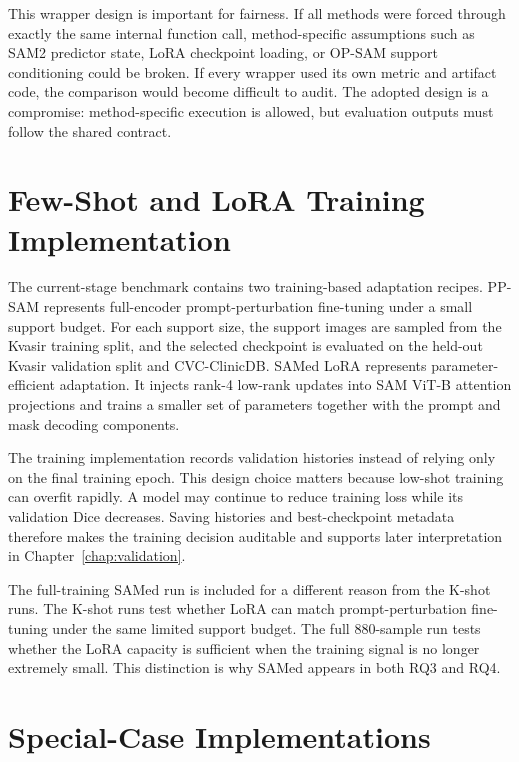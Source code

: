 This wrapper design is important for fairness. If all methods were forced through exactly the same internal function call, method-specific assumptions such as SAM2 predictor state, LoRA checkpoint loading, or OP-SAM support conditioning could be broken. If every wrapper used its own metric and artifact code, the comparison would become difficult to audit. The adopted design is a compromise: method-specific execution is allowed, but evaluation outputs must follow the shared contract.

\section{Few-Shot and LoRA Training Implementation}
\label{sec:training-implementation}

The current-stage benchmark contains two training-based adaptation recipes. PP-SAM represents full-encoder prompt-perturbation fine-tuning under a small support budget. For each support size, the support images are sampled from the Kvasir training split, and the selected checkpoint is evaluated on the held-out Kvasir validation split and CVC-ClinicDB. SAMed LoRA represents parameter-efficient adaptation. It injects rank-4 low-rank updates into SAM ViT-B attention projections and trains a smaller set of parameters together with the prompt and mask decoding components.

The training implementation records validation histories instead of relying only on the final training epoch. This design choice matters because low-shot training can overfit rapidly. A model may continue to reduce training loss while its validation Dice decreases. Saving histories and best-checkpoint metadata therefore makes the training decision auditable and supports later interpretation in Chapter~\ref{chap:validation}.

The full-training SAMed run is included for a different reason from the K-shot runs. The K-shot runs test whether LoRA can match prompt-perturbation fine-tuning under the same limited support budget. The full 880-sample run tests whether the LoRA capacity is sufficient when the training signal is no longer extremely small. This distinction is why SAMed appears in both RQ3 and RQ4.

\section{Special-Case Implementations}
\label{sec:special-case-implementation}


